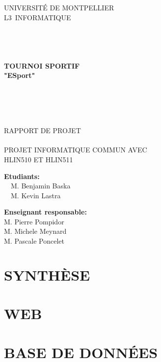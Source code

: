 \documentclass{article}
\begin{document}
\begin{center}
\linespread{2.0}\selectfont

{\Huge U}{\huge NIVERSITÉ DE }{\Huge M}{\huge ONTPELLIER}\\
{\huge L3}{\LARGE ~INFORMATIQUE }
\\~\\~\\~\\~\\
{\Large\textbf{TOURNOI SPORTIF\\"ESport"}}
\\~\\~\\~\\~\\

\linespread{1}\selectfont

RAPPORT DE PROJET\\~\\
PROJET INFORMATIQUE COMMUN AVEC\\
 HLIN510 ET HLIN511\\
\vfill
\end{center}
\begin{multicols}{2}
\begin{flushleft}
\textbf{Etudiants:}\\
~~M. Benjamin Baska\\
~~M. Kevin Lastra
\end{flushleft}
\columnbreak
\begin{flushright}
\textbf{Enseignant responsable:}\\
M. Pierre Pompidor~~~\\
M. Michele Meynard~~\\
M. Pascale Poncelet~~~
\end{flushright}
\end{multicols}
\newpage
\section{SYNTHÈSE}
\section{WEB}
\section{BASE DE DONNÉES}
\end{document}
